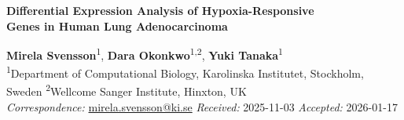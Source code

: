 \documentclass[11pt, a4paper]{article}
\begin{document}
\accentrule
\vspace{6pt}

{\LARGE\bfseries\color{darkgrey}
Differential Expression Analysis of Hypoxia-Responsive\\[3pt]
Genes in Human Lung Adenocarcinoma}

\vspace{6pt}
\accentrule
\vspace{5pt}

{\small\color{midgrey}
\textbf{Mirela Svensson}\textsuperscript{1},\;
\textbf{Dara Okonkwo}\textsuperscript{1,2},\;
\textbf{Yuki Tanaka}\textsuperscript{1}
\\[2pt]
\textsuperscript{1}Department of Computational Biology, Karolinska Institutet, Stockholm, Sweden\quad
\textsuperscript{2}Wellcome Sanger Institute, Hinxton, UK
\\[2pt]
\textit{Correspondence:} \href{mailto:mirela.svensson@ki.se}{mirela.svensson@ki.se}\quad
\textit{Received:} 2025-11-03\quad
\textit{Accepted:} 2026-01-17
}

\vspace{8pt}








\end{document}
